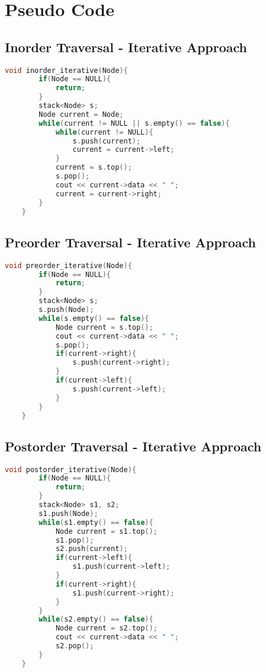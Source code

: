 \documentclass[11pt]{article}
\begin{document}
\section{Pseudo Code}

\subsection{Inorder Traversal - Iterative Approach}
\begin{lstlisting}[language=C++]
    void inorder_iterative(Node){
        if(Node == NULL){
            return;
        }
        stack<Node> s;
        Node current = Node;
        while(current != NULL || s.empty() == false){
            while(current != NULL){
                s.push(current);
                current = current->left;
            }
            current = s.top();
            s.pop();
            cout << current->data << " ";
            current = current->right;
        }
    }
\end{lstlisting}

\subsection{Preorder Traversal - Iterative Approach}

\begin{lstlisting}[language=C++]
    void preorder_iterative(Node){
        if(Node == NULL){
            return;
        }
        stack<Node> s;
        s.push(Node);
        while(s.empty() == false){
            Node current = s.top();
            cout << current->data << " ";
            s.pop();
            if(current->right){
                s.push(current->right);
            }
            if(current->left){
                s.push(current->left);
            }
        }
    }
\end{lstlisting}


\subsection{Postorder Traversal - Iterative Approach}

\begin{lstlisting}[language=C++]
    void postorder_iterative(Node){
        if(Node == NULL){
            return;
        }
        stack<Node> s1, s2;
        s1.push(Node);
        while(s1.empty() == false){
            Node current = s1.top();
            s1.pop();
            s2.push(current);
            if(current->left){
                s1.push(current->left);
            }
            if(current->right){
                s1.push(current->right);
            }
        }
        while(s2.empty() == false){
            Node current = s2.top();
            cout << current->data << " ";
            s2.pop();
        }
    }
\end{lstlisting}
\end{document}

